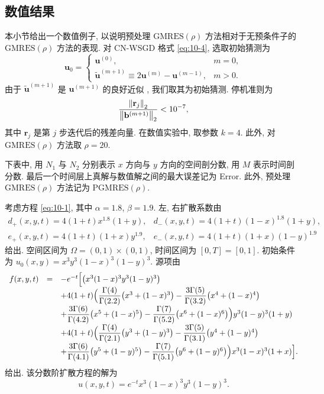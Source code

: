 \subsection{数值结果}
\label{sec:10-3-3}

本小节给出一个数值例子, 以说明预处理 $\mathrm{GMRES}(\rho)$ 方法相对于无预条件子的 $\mathrm{GMRES}(\rho)$ 方法的表现. 对 CN-WSGD 格式 \eqref{eq:10-4}, 选取初始猜测为
\[
  \mathbf{u}_{0}=
  \left\{
  \begin{array}{ll}
    \mathbf{u}^{(0)}, & m=0,\\[1mm]
    \tilde{\mathbf{u}}^{(m+1)}\equiv 2\mathbf{u}^{(m)}-\mathbf{u}^{(m-1)}, & m>0.
  \end{array}
  \right.
\]
由于 $\tilde{\mathbf{u}}^{(m+1)}$ 是 $\mathbf{u}^{(m+1)}$ 的良好近似 \cite{src:90}, 我们取其为初始猜测. 停机准则为
\[
  \frac{\left\|\mathbf{r}_{j}\right\|_{2}}{\left\|\mathbf{b}^{(m+1)}\right\|_{2}}<10^{-7},
\]
其中 $\mathbf{r}_{j}$ 是第 $j$ 步迭代后的残差向量. 在数值实验中, 取参数 $k=4$. 此外, 对 $\mathrm{GMRES}(\rho)$ 方法取 $\rho=20$.

下表中, 用 $N_{1}$ 与 $N_{2}$ 分别表示 $x$ 方向与 $y$ 方向的空间剖分数, 用 $M$ 表示时间剖分数. 最后一个时间层上真解与数值解之间的最大误差记为 Error. 此外, 预处理 $\mathrm{GMRES}(\rho)$ 方法记为 $\mathrm{PGMRES}(\rho)$.

\begin{example}
\label{ex:10-1}
考虑方程 \eqref{eq:10-1}, 其中 $\alpha=1.8$, $\beta=1.9$. 左, 右扩散系数由
\[
\begin{array}{ll}
  d_{+}(x,y,t)=4(1+t)x^{1.8}(1+y), & d_{-}(x,y,t)=4(1+t)(1-x)^{1.8}(1+y),\\[1mm]
  e_{+}(x,y,t)=4(1+t)(1+x)y^{1.9}, & e_{-}(x,y,t)=4(1+t)(1+x)(1-y)^{1.9}
\end{array}
\]
给出. 空间区间为 $\Omega=(0,1)\times(0,1)$, 时间区间为 $[0,T]=[0,1]$. 初始条件为 $u_{0}(x,y)=x^{3}y^{3}(1-x)^{3}(1-y)^{3}$. 源项由
\[
\begin{array}{rcl}
  f(x,y,t) & = & -e^{-t}\Bigl[\bigl(x^{3}(1-x)^{3}y^{3}(1-y)^{3}\bigr)\\[1mm]
  & & +4(1+t)\Bigl(\dfrac{\Gamma(4)}{\Gamma(2.2)}\bigl(x^{3}+(1-x)^{3}\bigr)
        -\dfrac{3\Gamma(5)}{\Gamma(3.2)}\bigl(x^{4}+(1-x)^{4}\bigr)\\[1mm]
  & & +\dfrac{3\Gamma(6)}{\Gamma(4.2)}\bigl(x^{5}+(1-x)^{5}\bigr)
        -\dfrac{\Gamma(7)}{\Gamma(5.2)}\bigl(x^{6}+(1-x)^{6}\bigr)\Bigr)y^{3}(1-y)^{3}(1+y)\\[1mm]
  & & +4(1+t)\Bigl(\dfrac{\Gamma(4)}{\Gamma(2.1)}\bigl(y^{3}+(1-y)^{3}\bigr)
        -\dfrac{3\Gamma(5)}{\Gamma(3.1)}\bigl(y^{4}+(1-y)^{4}\bigr)\\[1mm]
  & & +\dfrac{3\Gamma(6)}{\Gamma(4.1)}\bigl(y^{5}+(1-y)^{5}\bigr)
        -\dfrac{\Gamma(7)}{\Gamma(5.1)}\bigl(y^{6}+(1-y)^{6}\bigr)\Bigr)x^{3}(1-x)^{3}(1+x)\Bigr].
\end{array}
\]
给出. 该分数阶扩散方程的解为
\[
  u(x,y,t)=e^{-t}x^{3}(1-x)^{3}y^{3}(1-y)^{3}.
\]
\end{example}

